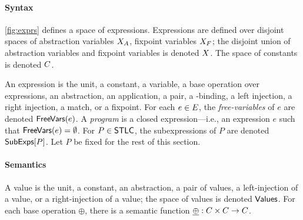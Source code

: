 \paragraph{Syntax}
\autoref{fig:exprs} defines a space of expressions.
%
Expressions are defined over disjoint spaces of abstraction variables
$X_A$, fixpoint variables $X_F$;
%
the disjoint union of abstraction variables and fixpoint variables is
denoted $X$.
%
The space of constants is denoted $C$.

An expression is the unit, a constant, a variable, a base operation
over expressions, an abstraction, an application, a pair, a
-binding, a left injection, a right injection, a match, or a
fixpoint.
%
For each $e \in E$, the \emph{free-variables} of $e$ are denoted
$\mathsf{FreeVars}(e)$.
%
A \emph{program} is a closed expression---i.e., an expression $e$
such that $\mathsf{FreeVars}(e) = \emptyset$.
%
For $P \in \mathsf{STLC}$, the subexpressions of $P$ are denoted
$\mathsf{SubExps}[  P  ]$.
%
Let $P$ be fixed for the rest of this section.

\paragraph{Semantics}
%
%
A value is the unit, a constant, an abstraction, a pair of values, a
left-injection of a value, or a right-injection of a value;
%
the space of values is denoted $\mathsf{Values}$.
%
For each base operation $\oplus$, there is a semantic function
$\underline{\oplus} : C \times C \to C$.

